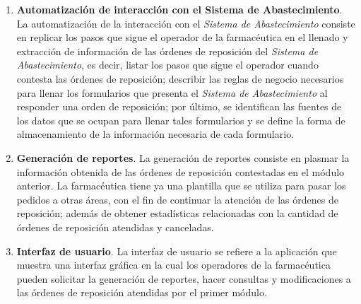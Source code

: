 \begin{enumerate}
\item \textbf{Automatización de interacción con el Sistema de Abastecimiento}. La automatización de la interacción con el \textit{Sistema de Abastecimiento} consiste en replicar los pasos que sigue el operador de la farmacéutica en el llenado y extracción de información de las órdenes de reposición del \textit{Sistema de Abastecimiento}, es decir, listar los pasos que sigue el operador cuando contesta las órdenes de reposición; describir las reglas de negocio necesarios para llenar los formularios que presenta el \textit{Sistema de Abastecimiento} al responder una orden de reposición; por último, se identifican las fuentes de los datos que se ocupan para llenar tales formularios y se define la forma de almacenamiento de la información necesaria de cada formulario.
\item \textbf{Generación de reportes}. La generación de reportes consiste en plasmar la información obtenida de las órdenes de reposición contestadas en el módulo anterior. La farmacéutica tiene ya una plantilla que se utiliza para pasar los pedidos a otras áreas, con el fin de continuar la atención de las órdenes de reposición; además de obtener estadísticas relacionadas con la cantidad de órdenes de reposición atendidas y canceladas.
\item \textbf{Interfaz de usuario}. La interfaz de usuario se refiere a la aplicación que muestra una interfaz gráfica en la cual los operadores de la farmacéutica pueden solicitar la generación de reportes, hacer consultas y modificaciones a las órdenes de reposición atendidas por el primer módulo.
\end{enumerate}

